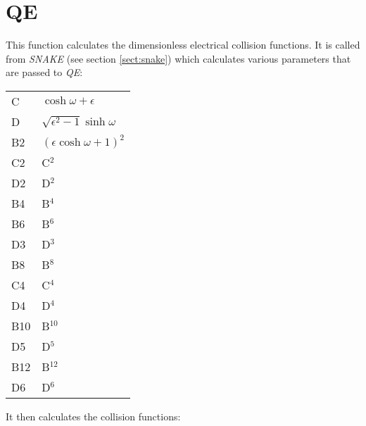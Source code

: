 \section{QE}
\label{sect:qe}

\noindent This function calculates the dimensionless electrical
collision functions. It is called from {\em SNAKE} (see section
\ref{sect:snake}) which calculates various parameters that are passed
to {\em QE}:\\

\begin{center}
\begin{tabular}{ll}
C & $\cosh\omega + \epsilon$\\
D & $\sqrt{\epsilon^2-1} \sinh\omega$\\
B2 & $(\epsilon \cosh\omega + 1)^2$\\
C2 & C$^2$\\
D2 & D$^2$\\
B4 & B$^4$\\
B6 & B$^6$\\
D3 & D$^3$\\
B8 & B$^8$\\
C4 & C$^4$\\
D4 & D$^4$\\
B10 & B$^{10}$\\
D5 & D$^5$\\
B12 & B$^{12}$\\
D6 & D$^6$\\
\end{tabular}
\end{center}

\noindent It then calculates the collision functions:\\

